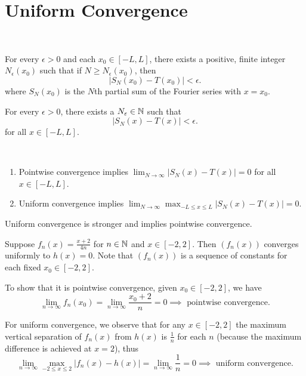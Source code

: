 \documentclass[class=article,crop=false]{standalone}
\begin{document}
\newpage
\section{Uniform Convergence}

~\begin{defn}
	For every $ \epsilon >0$ and each $ x_0 \in [-L,L]$, there exists a positive, finite integer $ N_{ \epsilon}(x_0)$ such that if $ N \geq N_{ \epsilon}(x_0)$, then
	\[
		|S_N(x_0)-T(x_0)|< \epsilon
	.\] 
	where $ S_N(x_0)$ is the $ N$th partial sum of the Fourier series with  $ x=x_0$.
\end{defn}
\begin{defn}
For every $ \epsilon > 0$, there exists a $ N_{ \varepsilon} \in \mathbb{N}$ such that 
\[
	|S_N(x)-T(x)|< \epsilon
.\] 
for all $ x \in [-L,L]$.
\end{defn}

\begin{note}[]
~\begin{enumerate}[label=\alph*)]
	\item Pointwise convergence implies $ \lim_{ N \to \infty} |S_N(x)-T(x)| =0$ for all $ x \in [-L,L]$.
	\item Uniform convergence implies $ \lim_{ N \to \infty} \max_{-L\leq x \leq L} |S_N(x) - T(x)| = 0$.
\end{enumerate}
Uniform convergence is stronger and implies pointwise convergence. 
\end{note}

\begin{eg}[]
	Suppose $ f_n(x) = \frac{x+2}{4n}$ for $ n \in \mathbb{N}$ and $ x \in [-2,2]$. Then $ ( f_n(x))$ converges uniformly to $ h(x) =0 $. Note that  $ (f_n(x))$ is a sequence of constants for each fixed $ x_0 \in [-2,2]$.

	To show that it is pointwise convergence, given $ x_0 \in [-2,2]$, we have
	\[
		\lim_{ n \to \infty} f_n(x_0) = \lim_{ n \to \infty} \frac{x_0+2}{n}=0 \implies \text{ pointwise convergence} 
	.\] 

	For uniform convergence, we observe that for any $ x \in [-2,2]$ the maximum vertical separation of $ f_n(x)$ from $ h(x)$ is  $ \frac{1}{n}$ for each $ n$ (because the maximum difference is achieved at $ x=2$), thus
	 \[
		 \lim_{ n \to \infty} \max_{-2\leq x \leq 2} |f_n(x)-h(x)| = \lim_{ n \to \infty} \frac{1}{n} = 0 \implies \text{ uniform convergence} 
	.\] 
\end{eg}
\end{document}
